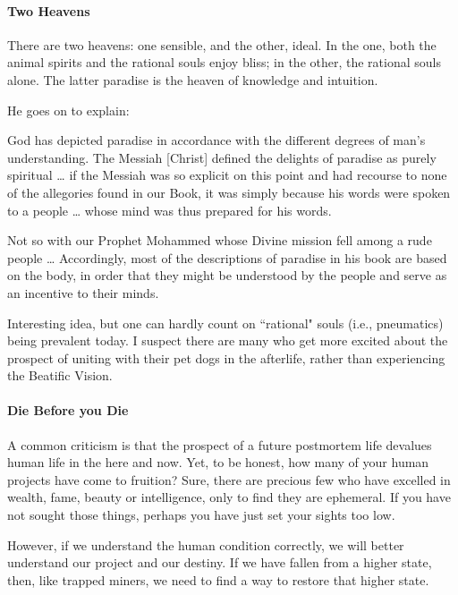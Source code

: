 \paragraph{Two Heavens}
\begin{quotex}
There are two heavens: one sensible, and the other, ideal. In the one, both the animal spirits and the rational souls enjoy bliss; in the other, the rational souls alone. The latter paradise is the heaven of knowledge and intuition. 

\end{quotex}
He goes on to explain:

\begin{quotex}
God has depicted paradise in accordance with the different degrees of man's understanding. The Messiah [Christ] defined the delights of paradise as purely spiritual … if the Messiah was so explicit on this point and had recourse to none of the allegories found in our Book, it was simply because his words were spoken to a people … whose mind was thus prepared for his words.

Not so with our Prophet Mohammed whose Divine mission fell among a rude people … Accordingly, most of the descriptions of paradise in his book are based on the body, in order that they might be understood by the people and serve as an incentive to their minds. 

\end{quotex}
Interesting idea, but one can hardly count on ``rational" souls (i.e., pneumatics) being prevalent today. I suspect there are many who get more excited about the prospect of uniting with their pet dogs in the afterlife, rather than experiencing the Beatific Vision.

\paragraph{Die Before you Die}
A common criticism is that the prospect of a future postmortem life devalues human life in the here and now. Yet, to be honest, how many of your human projects have come to fruition? Sure, there are precious few who have excelled in wealth, fame, beauty or intelligence, only to find they are ephemeral. If you have not sought those things, perhaps you have just set your sights too low.

However, if we understand the human condition correctly, we will better understand our project and our destiny. If we have fallen from a higher state, then, like trapped miners, we need to find a way to restore that higher state.

